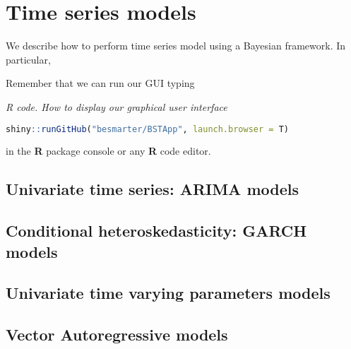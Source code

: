 \chapter{Time series models}\label{chap8}
We describe how to perform time series model using a Bayesian framework. In particular,

Remember that we can run our GUI typing

\begin{tcolorbox}[enhanced,width=4.67in,center upper,
	fontupper=\large\bfseries,drop shadow southwest,sharp corners]
	\textit{R code. How to display our graphical user interface}
	\begin{VF}
		\begin{lstlisting}[language=R]
			shiny::runGitHub("besmarter/BSTApp", launch.browser = T)
		\end{lstlisting}
	\end{VF}
\end{tcolorbox} 

in the \textbf{R} package console or any \textbf{R} code editor.

\section{Univariate time series: ARIMA models}\label{sec81}

\section{Conditional heteroskedasticity: GARCH models}\label{sec82}

\section{Univariate time varying parameters models}\label{sec83}

\section{Vector Autoregressive models}\label{sec84}
